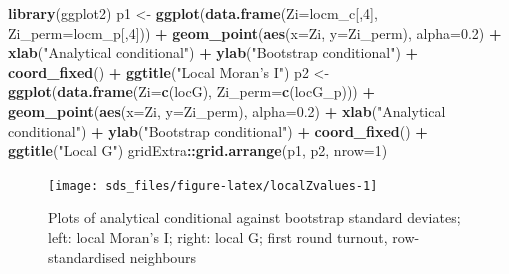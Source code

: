 \documentclass[]{book}
\newenvironment{Shaded}{\begin{snugshade}}{\end{snugshade}}
\newcommand{\DataTypeTok}[1]{\textcolor[rgb]{0.13,0.29,0.53}{#1}}
\newcommand{\DecValTok}[1]{\textcolor[rgb]{0.00,0.00,0.81}{#1}}
\newcommand{\FloatTok}[1]{\textcolor[rgb]{0.00,0.00,0.81}{#1}}
\newcommand{\KeywordTok}[1]{\textcolor[rgb]{0.13,0.29,0.53}{\textbf{#1}}}
\newcommand{\NormalTok}[1]{#1}
\newcommand{\OperatorTok}[1]{\textcolor[rgb]{0.81,0.36,0.00}{\textbf{#1}}}
\newcommand{\StringTok}[1]{\textcolor[rgb]{0.31,0.60,0.02}{#1}}
\begin{document}
\begin{Shaded}
\begin{Highlighting}[]
\KeywordTok{library}\NormalTok{(ggplot2)}
\NormalTok{p1 <-}\StringTok{ }\KeywordTok{ggplot}\NormalTok{(}\KeywordTok{data.frame}\NormalTok{(}\DataTypeTok{Zi=}\NormalTok{locm_c[,}\DecValTok{4}\NormalTok{], }\DataTypeTok{Zi_perm=}\NormalTok{locm_p[,}\DecValTok{4}\NormalTok{])) }\OperatorTok{+}\StringTok{ }\KeywordTok{geom_point}\NormalTok{(}\KeywordTok{aes}\NormalTok{(}\DataTypeTok{x=}\NormalTok{Zi,}
    \DataTypeTok{y=}\NormalTok{Zi_perm), }\DataTypeTok{alpha=}\FloatTok{0.2}\NormalTok{) }\OperatorTok{+}\StringTok{ }\KeywordTok{xlab}\NormalTok{(}\StringTok{"Analytical conditional"}\NormalTok{) }\OperatorTok{+}\StringTok{ }
\StringTok{    }\KeywordTok{ylab}\NormalTok{(}\StringTok{"Bootstrap conditional"}\NormalTok{) }\OperatorTok{+}\StringTok{ }\KeywordTok{coord_fixed}\NormalTok{() }\OperatorTok{+}\StringTok{ }\KeywordTok{ggtitle}\NormalTok{(}\StringTok{"Local Moran's I"}\NormalTok{)}
\NormalTok{p2 <-}\StringTok{ }\KeywordTok{ggplot}\NormalTok{(}\KeywordTok{data.frame}\NormalTok{(}\DataTypeTok{Zi=}\KeywordTok{c}\NormalTok{(locG), }\DataTypeTok{Zi_perm=}\KeywordTok{c}\NormalTok{(locG_p))) }\OperatorTok{+}\StringTok{ }\KeywordTok{geom_point}\NormalTok{(}\KeywordTok{aes}\NormalTok{(}\DataTypeTok{x=}\NormalTok{Zi, }
    \DataTypeTok{y=}\NormalTok{Zi_perm), }\DataTypeTok{alpha=}\FloatTok{0.2}\NormalTok{) }\OperatorTok{+}\StringTok{ }\KeywordTok{xlab}\NormalTok{(}\StringTok{"Analytical conditional"}\NormalTok{) }\OperatorTok{+}\StringTok{ }
\StringTok{    }\KeywordTok{ylab}\NormalTok{(}\StringTok{"Bootstrap conditional"}\NormalTok{) }\OperatorTok{+}\StringTok{ }\KeywordTok{coord_fixed}\NormalTok{() }\OperatorTok{+}\StringTok{ }\KeywordTok{ggtitle}\NormalTok{(}\StringTok{"Local G"}\NormalTok{)}
\NormalTok{gridExtra}\OperatorTok{::}\KeywordTok{grid.arrange}\NormalTok{(p1, p2, }\DataTypeTok{nrow=}\DecValTok{1}\NormalTok{)}
\end{Highlighting}
\end{Shaded}

\begin{figure}

{\centering \texttt{[image: sds\_files/figure-latex/localZvalues-1]} 

}

\caption{Plots of analytical conditional against bootstrap standard deviates; left: local Moran's I; right: local G; first round turnout, row-standardised neighbours}\label{fig:localZvalues}
\end{figure}
\end{document}
